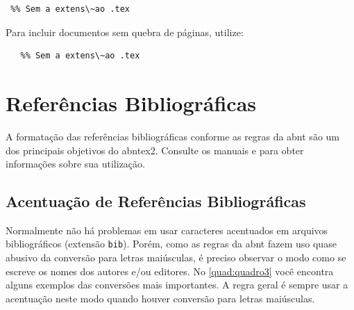 \begin{SingleSpacing}%
\begin{verbatim}
 %% Sem a extens\~ao .tex
\end{verbatim}
\end{SingleSpacing}

Para incluir documentos sem quebra de p\'aginas, utilize:

\begin{SingleSpacing}%
\begin{verbatim}
   %% Sem a extens\~ao .tex
\end{verbatim}
\end{SingleSpacing}

\section{Refer\^encias Bibliogr\'aficas}\label{sec:referencias}

A formata\c{c}\~ao das refer\^encias bibliogr\'aficas conforme as regras da \gls{abnt} s\~ao um dos principais objetivos do \gls{abntex2}. Consulte os manuais  e  para obter informa\c{c}\~oes sobre sua utiliza\c{c}\~ao.

\subsection{Acentua\c{c}\~ao de Refer\^encias Bibliogr\'aficas}\label{sec:acentuacaodereferencias}

Normalmente n\~ao h\'a problemas em usar caracteres acentuados em arquivos bibliogr\'aficos (extens\~ao \texttt{bib}). Por\'em, como as regras da \gls{abnt} fazem uso quase abusivo da convers\~ao para letras mai\'usculas, \'e preciso observar o modo como se escreve os nomes dos autores e/ou editores. No \autoref{quad:quadro3} voc\^e encontra alguns exemplos das convers\~oes mais importantes. A regra geral \'e sempre usar a acentua\c{c}\~ao neste modo quando houver convers\~ao para letras mai\'usculas.

